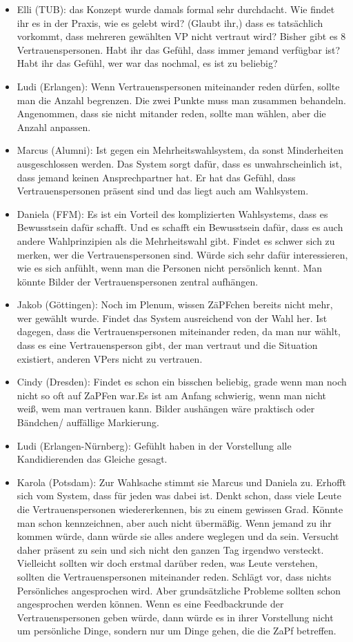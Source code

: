 \begin{itemize}
        \item Elli (TUB): das Konzept wurde damals formal sehr durchdacht. Wie findet ihr es in der Praxis, wie es gelebt wird? (Glaubt ihr,) dass es tatsächlich vorkommt, dass mehreren gewählten VP nicht vertraut wird? Bisher gibt es 8 Vertrauenspersonen. Habt ihr das Gefühl, dass immer jemand verfügbar ist? Habt ihr das Gefühl, wer war das nochmal, es ist zu beliebig?
        \item Ludi (Erlangen): Wenn Vertrauenspersonen miteinander reden dürfen, sollte man die Anzahl begrenzen. Die zwei Punkte muss man zusammen behandeln. Angenommen, dass sie nicht mitander reden, sollte man wählen, aber die Anzahl anpassen.
        \item Marcus (Alumni): Ist gegen ein Mehrheitswahlsystem, da sonst Minderheiten ausgeschlossen werden. Das System sorgt dafür, dass es unwahrscheinlich ist, dass jemand keinen Ansprechpartner hat. Er hat das Gefühl, dass Vertrauenspersonen präsent sind und das liegt auch am Wahlsystem.
        \item Daniela (FFM): Es ist ein Vorteil des komplizierten Wahlsystems, dass es Bewusstsein dafür schafft. Und es schafft ein Bewusstsein dafür, dass es auch andere Wahlprinzipien als die Mehrheitswahl gibt. Findet es schwer sich zu merken, wer die Vertrauenspersonen sind. Würde sich sehr dafür interessieren, wie es sich anfühlt, wenn man die Personen nicht persönlich kennt. Man könnte Bilder der Vertrauenspersonen zentral aufhängen.
        \item Jakob (Göttingen): Noch im Plenum, wissen ZäPFchen bereits nicht mehr, wer gewählt wurde. Findet das System ausreichend von der Wahl her. Ist dagegen, dass die Vertrauenspersonen miteinander reden, da man nur wählt, dass es eine Vertrauensperson gibt, der man vertraut und die Situation existiert, anderen VPers nicht zu vertrauen.
        \item Cindy (Dresden): Findet es schon ein bisschen beliebig, grade wenn man noch nicht so oft auf ZaPFen war.Es ist am Anfang schwierig, wenn man nicht weiß, wem man vertrauen kann. Bilder aushängen wäre praktisch oder Bändchen/ auffällige Markierung.
        \item Ludi (Erlangen-Nürnberg): Gefühlt haben in der Vorstellung alle Kandidierenden das Gleiche gesagt.
        \item Karola (Potsdam): Zur Wahlsache stimmt sie Marcus und Daniela zu. Erhofft sich vom System, dass für jeden was dabei ist. Denkt schon, dass viele Leute die Vertrauenspersonen wiedererkennen, bis zu einem gewissen Grad. Könnte man schon kennzeichnen, aber auch nicht übermäßig. Wenn jemand zu ihr kommen würde, dann würde sie alles andere weglegen und da sein. Versucht daher präsent zu sein und sich nicht den ganzen Tag irgendwo versteckt. Vielleicht sollten wir doch erstmal darüber reden, was Leute verstehen, sollten die Vertrauenspersonen miteinander reden. Schlägt vor, dass nichts Persönliches angesprochen wird. Aber grundsätzliche Probleme sollten schon angesprochen werden können. Wenn es eine Feedbackrunde der Vertrauenspersonen geben würde, dann würde es in ihrer Vorstellung nicht um persönliche Dinge, sondern nur um Dinge gehen, die die ZaPf betreffen.

\end{itemize}
